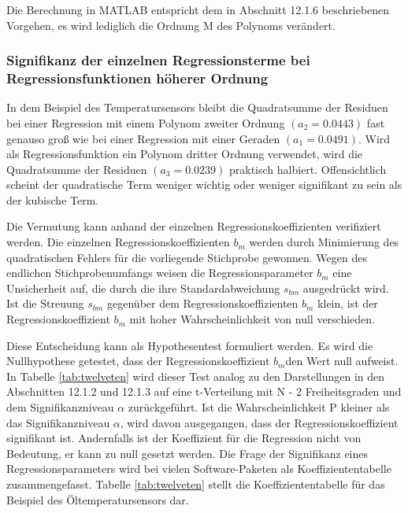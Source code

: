 \noindent Die Berechnung in MATLAB entspricht dem in Abschnitt 12.1.6 beschriebenen Vorgehen, es wird lediglich die Ordnung M des Polynoms ver\"{a}ndert.


\subsubsection{Signifikanz der einzelnen Regressionsterme bei Regressionsfunktionen h\"{o}herer Ordnung}

\noindent In dem Beispiel des Temperatursensors bleibt die Quadratsumme der Residuen bei einer Regression mit einem Polynom zweiter Ordnung $(a_{2} = 0.0443)$ fast genauso gro{\ss} wie bei einer Regression mit einer Geraden $(a_{1} = 0.0491)$. Wird als Regressionsfunktion ein Polynom dritter Ordnung verwendet, wird die Quadratsumme der Residuen $(a_{3} = 0.0239)$ praktisch halbiert. Offensichtlich scheint der quadratische Term weniger wichtig oder weniger signifikant zu sein als der kubische Term.\newline

\noindent Die Vermutung kann anhand der einzelnen Regressionskoeffizienten verifiziert werden. Die einzelnen Regressionskoeffizienten $b_{m}$ werden durch Minimierung des quadratischen Fehlers f\"{u}r die vorliegende Stichprobe gewonnen. Wegen des endlichen Stichprobenumfangs weisen die Regressionsparameter $b_{m}$ eine Unsicherheit auf, die durch die ihre Standardabweichung $s_{bm}$ ausgedr\"{u}ckt wird. Ist die Streuung $s_{bm}$ gegen\"{u}ber dem Regressionskoeffizienten $b_{m}$ klein, ist der Regressionskoeffizient $b_{m}$ mit hoher Wahrscheinlichkeit von null verschieden. \newline

\noindent Diese Entscheidung kann als Hypothesentest formuliert werden. Es wird die Nullhypothese getestet, dass der Regressionskoeffizient $b_{m}$den Wert null aufweist. In Tabelle \ref{tab:twelveten} wird dieser Test analog zu den Darstellungen in den Abschnitten 12.1.2 und 12.1.3 auf eine t-Verteilung mit N - 2 Freiheitsgraden und dem Signifikanzniveau $\alpha$ zur\"{u}ckgef\"{u}hrt. Ist die Wahrscheinlichkeit P kleiner als das Signifikanzniveau $\alpha$, wird davon ausgegangen, dass der Regressionskoeffizient signifikant ist. Andernfalls ist der Koeffizient f\"{u}r die Regression nicht von Bedeutung, er kann zu null gesetzt werden. Die Frage der Signifikanz eines Regressionsparameters wird bei vielen Software-Paketen als Koeffiziententabelle zusammengefasst. Tabelle \ref{tab:twelveten} stellt die Koeffiziententabelle f\"{u}r das Beispiel des \"{O}ltemperatursensors dar.

